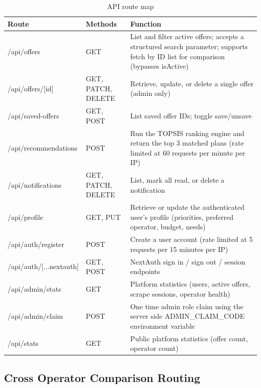 \begin{table}[H]
  \caption{API route map}
  \label{tab:api-routes}
  \centering\small
  \begin{tabular}{|p{4.2cm}|p{2.6cm}|p{7.0cm}|}
    \hline
    \textbf{Route} & \textbf{Methods} & \textbf{Function} \\
    \hline
    /api/offers              & GET                & List and filter active offers; accepts a structured search parameter; supports fetch by ID list for comparison (bypasses isActive) \\
    \hline
    /api/offers/[id]         & GET, PATCH, DELETE & Retrieve, update, or delete a single offer (admin only) \\
    \hline
    /api/saved-offers        & GET, POST          & List saved offer IDs; toggle save/unsave \\
    \hline
    /api/recommendations     & POST               & Run the TOPSIS ranking engine and return the top 3 matched plans (rate limited at 60 requests per minute per IP) \\
    \hline
    /api/notifications       & GET, PATCH, DELETE & List, mark all read, or delete a notification \\
    \hline
    /api/profile             & GET, PUT           & Retrieve or update the authenticated user's profile (priorities, preferred operator, budget, needs) \\
    \hline
    /api/auth/register       & POST               & Create a user account (rate limited at 5 requests per 15 minutes per IP) \\
    \hline
    /api/auth/[...nextauth] & GET, POST       & NextAuth sign in / sign out / session endpoints \\
    \hline
    /api/admin/stats         & GET                & Platform statistics (users, active offers, scrape sessions, operator health) \\
    \hline
    /api/admin/claim         & POST               & One time admin role claim using the server side ADMIN\_CLAIM\_CODE environment variable \\
    \hline
    /api/stats               & GET                & Public platform statistics (offer count, operator count) \\
    \hline
  \end{tabular}
\end{table}

\subsection{Cross Operator Comparison Routing}

